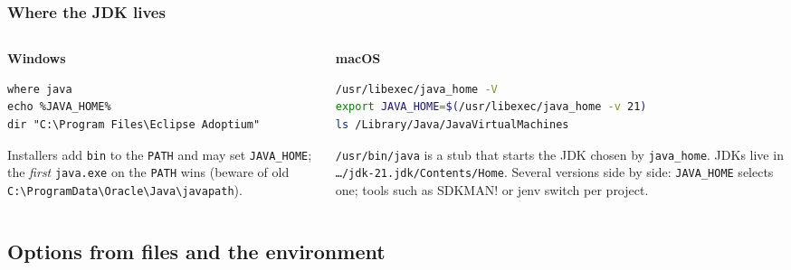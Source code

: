 \documentclass[aspectratio=169,10pt,compress]{beamer}
\newcommand{\win}{\textbf{Windows}}
\newcommand{\mac}{\textbf{macOS}}
\begin{document}
\begin{frame}[t,fragile] \frametitle{Where the JDK lives}
  \begin{columns}[T]
    \begin{column}{0.48\textwidth}
      \begin{block}{\win}


\begin{lstlisting}[style=codesnippet, language={}, basicstyle=\ttfamily\scriptsize]
where java
echo %JAVA_HOME%
dir "C:\Program Files\Eclipse Adoptium"
\end{lstlisting}


      \end{block}
      \small Installers add \texttt{bin} to the \texttt{PATH} and may set \texttt{JAVA\_HOME}; the \emph{first} \texttt{java.exe}
      on the \texttt{PATH} wins (beware of old \texttt{C:\textbackslash ProgramData\textbackslash Oracle\textbackslash Java\textbackslash javapath}).
    \end{column}
    \begin{column}{0.48\textwidth}
      \begin{block}{\mac}


\begin{lstlisting}[style=codesnippet, language=bash, basicstyle=\ttfamily\scriptsize]
/usr/libexec/java_home -V
export JAVA_HOME=$(/usr/libexec/java_home -v 21)
ls /Library/Java/JavaVirtualMachines
\end{lstlisting}


      \end{block}
      \small \texttt{/usr/bin/java} is a stub that starts the JDK chosen by \texttt{java\_home}.
      JDKs live in \texttt{\dots/jdk-21.jdk/Contents/Home}. Several versions side by side: \texttt{JAVA\_HOME} selects one;
      tools such as SDKMAN! or jenv switch per project.
    \end{column}
  \end{columns}
\end{frame}

\subsection[Options]{Options from files and the environment}
\end{document}
